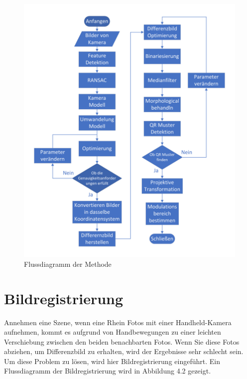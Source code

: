 \begin{figure}[H]
 \centering 
 \includegraphics[keepaspectratio,width=1.0\textwidth]{images/3_Ersteverfahren/Flussdiagrammsum.pdf}
 \caption{Flussdiagramm der Methode}
 \label{fig:Flussdiagramm der Methode}
\end{figure}

\section{Bildregistrierung} 

Annehmen eine Szene, wenn eine Rhein Fotos mit einer Handheld-Kamera aufnehmen, kommt es aufgrund von Handbewegungen zu einer leichten Verschiebung zwischen den beiden benachbarten Fotos. Wenn Sie diese Fotos abziehen, um Differenzbild zu erhalten, wird der Ergebnisse sehr schlecht sein. Um diese Problem zu lösen, wird hier Bildregistrierung eingeführt. Ein Flussdiagramm der Bildregistrierung wird in Abbildung 4.2 gezeigt. 

